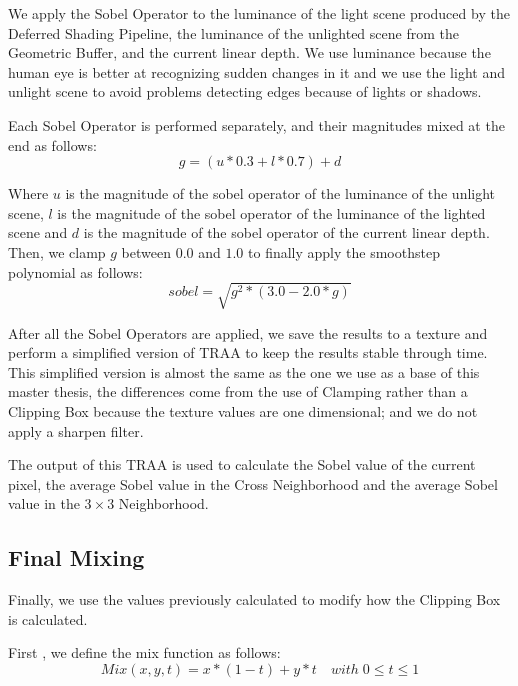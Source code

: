 \documentclass{cslthse-msc}
\begin{document}
We apply the Sobel Operator to the luminance of the light scene produced by the Deferred Shading Pipeline, the luminance of the unlighted scene from the Geometric Buffer, and the current linear depth. We use luminance because the human eye is better at recognizing sudden changes in it and we use the light and unlight scene to avoid problems detecting edges because of lights or shadows.

Each Sobel Operator is performed separately, and their magnitudes mixed at the end as follows:
\begin{equation} \label{eq:sobel_g}
	g=(u*0.3 +l*0.7)+d 
\end{equation}

Where $u$ is the magnitude of the sobel operator of the luminance of the unlight scene, $l$ is the magnitude of the sobel operator of the luminance of the lighted scene and $d$ is the magnitude of the sobel operator of the current linear depth. \\

Then, we clamp $g$ between $0.0$ and $1.0$ to finally apply the smoothstep polynomial as follows:
\begin{equation} \label{eq:sobel_sqrt}
sobel=\sqrt{g^2*(3.0-2.0*g)} 
\end{equation}

After all the Sobel Operators are applied, we save the results to a texture and perform a simplified version of TRAA to keep the results stable through time. This simplified version is almost the same as the one we use as a base of this master thesis, the differences come from the use of Clamping rather than a Clipping Box because the texture values are one dimensional; and we do not apply a sharpen filter.

The output of this TRAA is used to calculate the Sobel value of the current pixel, the average Sobel value in the Cross Neighborhood and the average Sobel value in the $3\times 3$ Neighborhood.

\subsection{Final Mixing}
Finally, we use the values previously calculated to modify how the Clipping Box is calculated.

First , we define the mix function as follows:
\begin{equation} \label{eq:mixfunction}
Mix(x,y,t)=x*(1-t)+y*t\quad with\; 0\leq t\leq 1
\end{equation} 
\end{document}
